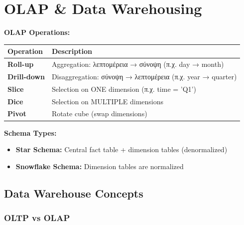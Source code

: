
\chapter{OLAP \& Data Warehousing}

\begin{formulabox}
\textbf{OLAP Operations:}
\begin{center}
\begin{tabular}{lp{8cm}}
\toprule
\textbf{Operation} & \textbf{Description} \\
\midrule
\textbf{Roll-up} & Aggregation: λεπτομέρεια → σύνοψη (π.χ. day → month) \\
\textbf{Drill-down} & Disaggregation: σύνοψη → λεπτομέρεια (π.χ. year → quarter) \\
\textbf{Slice} & Selection on ONE dimension (π.χ. time = 'Q1') \\
\textbf{Dice} & Selection on MULTIPLE dimensions \\
\textbf{Pivot} & Rotate cube (swap dimensions) \\
\bottomrule
\end{tabular}
\end{center}

\textbf{Schema Types:}
\begin{itemize}
    \item \textbf{Star Schema:} Central fact table + dimension tables (denormalized)
    \item \textbf{Snowflake Schema:} Dimension tables are normalized
\end{itemize}
\end{formulabox}

\section{Data Warehouse Concepts}

\subsection{OLTP vs OLAP}

